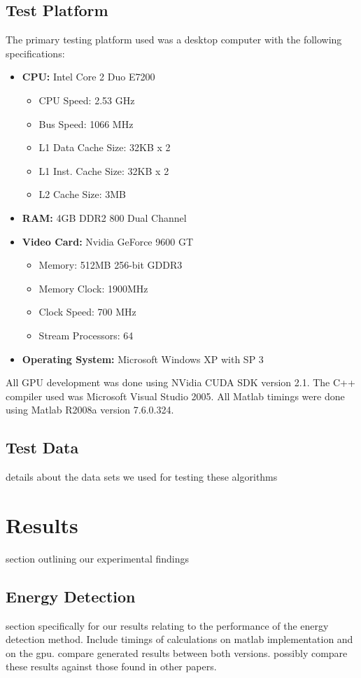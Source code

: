 \subsection{Test Platform}
\label{sect:test_platform}
The primary testing platform used was a desktop computer with the following specifications:
\begin{itemize}
\item \textbf{CPU:} Intel Core 2 Duo E7200
	\begin{itemize}
	\item CPU Speed: 2.53 GHz
	\item Bus Speed: 1066 MHz
	\item L1 Data Cache Size: 32KB x 2
	\item L1 Inst. Cache Size: 32KB x 2
	\item L2 Cache Size: 3MB
	\end{itemize}
\item \textbf{RAM:} 4GB DDR2 800 Dual Channel
\item \textbf{Video Card:} Nvidia GeForce 9600 GT
	\begin{itemize}
	\item Memory: 512MB 256-bit GDDR3
	\item Memory Clock: 1900MHz
	\item Clock Speed: 700 MHz
	\item Stream Processors: 64
	\end{itemize}
\item \textbf{Operating System:} Microsoft Windows XP with SP 3
\end{itemize}

All GPU development was done using NVidia CUDA SDK version 2.1.  The C++ compiler used was Microsoft Visual Studio 2005.  All Matlab timings were done using Matlab R2008a version 7.6.0.324.

\subsection{Test Data}
details about the data sets we used for testing these algorithms



\section{Results}
section outlining our experimental findings

\subsection{Energy Detection}
\label{sect:energy_detect_result}
section specifically for our results relating to the performance of the energy detection method.  Include timings of calculations on matlab implementation and on the gpu.  compare generated results between both versions.  possibly compare these results against those found in other papers.

